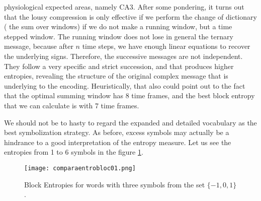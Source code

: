 \documentclass[10pt]{article}
\begin{document}
physiological
expected areas, namely CA3. After some pondering, it turns out that
the lousy compression is only effective if we perform the change of dictionary
( the sum over windows) if we do not make a running window, but a time stepped
window. The running window does not lose in general the ternary message, because
after $n$ time steps, we have enough linear equations to recover the
underlying signs. Therefore, the successive messages are not independent. They
follow a very specific and strict succession, and that produces higher entropies,
revealing the structure of the original complex message that is underlying to the
encoding. Heuristically, that also could point out to the fact that
the optimal summing window has 8 time frames, and the best block entropy
that we can calculate is with 7 time frames.

We should not be to hasty to regard the expanded and detailed vocabulary
as the best symbolization strategy. As before, excess symbols may actually be a
hindrance to a good interpretation of the entropy measure. Let us see the
entropies from 1 to 6 symbols in the figure \ref{entro6symbs}.

\begin{figure}
  \texttt{[image: comparaentrobloc01.png]}
  \caption{Block Entropies for words with three symbols from the
    set $\{ -1, 0, 1 \}$. 
  }\label{entro6symbs}
\end{figure}
\end{document}
